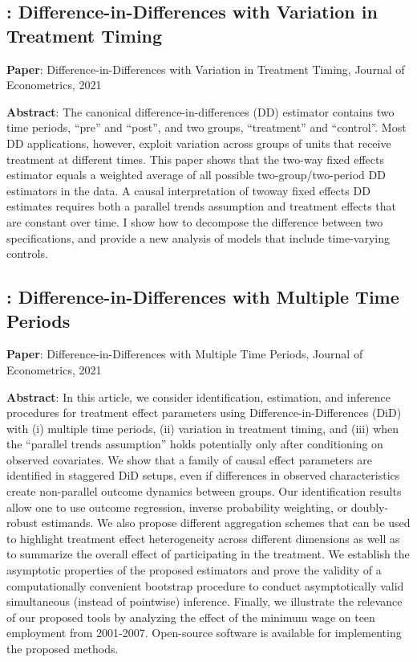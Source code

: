 \documentclass[12pt]{article}
\theoremstyle{definition}
\begin{document}
\subsection{\citet{goodman-baconDifferenceinDifferencesVariationTreatment2021}: Difference-in-Differences with Variation in Treatment Timing}

{\bf Paper}: Difference-in-Differences with Variation in Treatment Timing, Journal of Econometrics, 2021

{\bf Abstract}: The canonical difference-in-differences (DD) estimator contains two time periods, ``pre'' and ``post'', and two groups, ``treatment'' and ``control''. Most DD applications, however, exploit variation across groups of units that receive treatment at different times. This paper shows that the two-way fixed effects estimator equals a weighted average of all possible two-group/two-period DD estimators in the data. A causal interpretation of twoway fixed effects DD estimates requires both a parallel trends assumption and treatment effects that are constant over time. I show how to decompose the difference between two specifications, and provide a new analysis of models that include time-varying controls.

\subsection{\citet{callawayDifferenceinDifferencesMultipleTime2021}: Difference-in-Differences with Multiple Time Periods}

{\bf Paper}: Difference-in-Differences with Multiple Time Periods, Journal of Econometrics, 2021

{\bf Abstract}: In this article, we consider identification, estimation, and inference procedures for treatment effect parameters using Difference-in-Differences (DiD) with (i) multiple time periods, (ii) variation in treatment timing, and (iii) when the ``parallel trends assumption'' holds potentially only after conditioning on observed covariates. We show that a family of causal effect parameters are identified in staggered DiD setups, even if differences in observed characteristics create non-parallel outcome dynamics between groups. Our identification results allow one to use outcome regression, inverse probability weighting, or doubly-robust estimands. We also propose different aggregation schemes that can be used to highlight treatment effect heterogeneity across different dimensions as well as to summarize the overall effect of participating in the treatment. We establish the asymptotic properties of the proposed estimators and prove the validity of a computationally convenient bootstrap procedure to conduct asymptotically valid simultaneous (instead of pointwise) inference. Finally, we illustrate the relevance of our proposed tools by analyzing the effect of the minimum wage on teen employment from 2001-2007. Open-source software is available for implementing the proposed methods.
\end{document}
